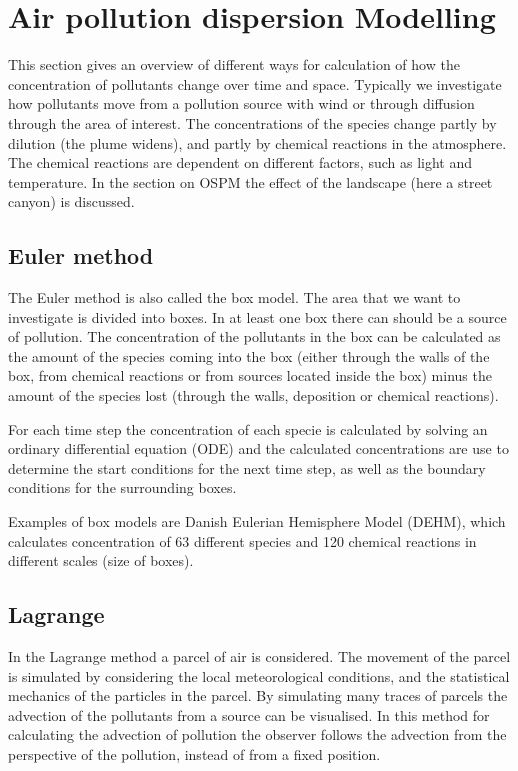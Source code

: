 \section{Air pollution dispersion Modelling}\label{dispersion}
This section gives an overview of different ways for calculation of how the concentration of pollutants change over time and space. Typically we investigate how pollutants move from a pollution source with wind or through diffusion through the area of interest. The concentrations of the species change partly by dilution (the plume widens), and partly by chemical reactions in the atmosphere. The chemical reactions are dependent on different factors, such as light and temperature. In the section on OSPM the effect of the landscape (here a street canyon) is discussed.

\subsection{Euler method}
The Euler method is also called the box model. The area that we want to investigate is divided into boxes. In at least one box there can should be a source of pollution. The concentration of the pollutants in the box can be calculated as the amount of the species coming into the box (either through the walls of the box, from chemical reactions or from sources located inside the box) minus the amount of the species lost (through the walls, deposition or chemical reactions).

For each time step the concentration of each specie is calculated by solving an ordinary differential equation (ODE) and the calculated concentrations are use to determine the start conditions for the next time step, as well as the boundary conditions for the surrounding boxes.

Examples of box models are Danish Eulerian Hemisphere Model (DEHM), which calculates concentration of 63 different species and 120 chemical reactions in different scales (size of boxes).

\subsection{Lagrange}
In the Lagrange method a parcel of air is considered. The movement of the parcel is simulated by considering the local meteorological conditions, and the statistical mechanics of the particles in the parcel. By simulating many traces of parcels the advection of the pollutants from a source can be visualised. In this method for calculating the advection of pollution the observer follows the advection from the perspective of the pollution, instead of from a fixed position.


